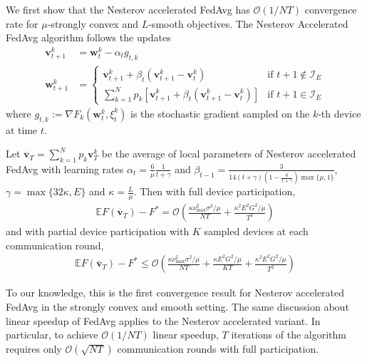 We first show that the Nesterov accelerated FedAvg has $\mathcal{O}(1/NT)$
convergence rate for $\mu$-strongly convex and $L$-smooth objectives.
The Nesterov Accelerated FedAvg algorithm follows the updates
\begin{align*}
\mathbf{v}_{t+1}^{k} & =\mathbf{w}_{t}^{k}-\alpha_{t}g_{t,k}\\
\mathbf{w}_{t+1}^{k} & =\begin{cases}
\mathbf{v}_{t+1}^{k}+\beta_{t}(\mathbf{v}_{t+1}^{k}-\mathbf{v}_{t}^{k}) & \text{if }t+1\notin\mathcal{I}_{E}\\
\sum_{k=1}^{N}p_{k}\left[\mathbf{v}_{t+1}^{k}+\beta_{t}(\mathbf{v}_{t+1}^{k}-\mathbf{v}_{t}^{k})\right] & \text{if }t+1\in\mathcal{I}_{E}
\end{cases}
\end{align*}
where $g_{t,k}:=\nabla F_{k}(\mathbf{w}_{t}^{k},\xi_{t}^{k})$ is
the stochastic gradient sampled on the $k$-th device at time $t$.  
\begin{theorem}
	\label{thm:nesterov_scvx}Let $\overline{\mathbf{v}}_{T}=\sum_{k=1}^{N}p_{k}\mathbf{v}_{T}^{k}$
	be the average of local parameters of Nesterov accelerated FedAvg
	with learning rates $\alpha_{t}=\frac{6}{\mu}\frac{1}{t+\gamma}$
	and $\beta_{t-1}=\frac{3}{14(t+\gamma)(1-\frac{6}{t+\gamma})\max\{\mu,1\}}$,
	$\gamma=\max\{32\kappa,E\}$ and $\kappa=\frac{L}{\mu}$. Then with
	full device participation, 
	\begin{align*}
	\mathbb{E}F(\overline{\mathbf{v}}_{T})-F^{\ast}=\mathcal{O}(\frac{\kappa\nu_{\max}^{2}\sigma^{2}/\mu}{NT}+\frac{\kappa^{2}E^{2}G^{2}/\mu}{T^{2}})
	\end{align*}
	and with partial device participation with $K$ sampled devices at
	each communication round, 
	\begin{align*}
	\mathbb{E}F(\overline{\mathbf{v}}_{T})-F^{\ast}\leq\mathcal{O}(\frac{\kappa\nu_{\max}^{2}\sigma^{2}/\mu}{NT}+\frac{\kappa E^{2}G^{2}/\mu}{KT}+\frac{\kappa^{2}E^{2}G^{2}/\mu}{T^{2}})
	\end{align*}
\end{theorem}
%
\begin{remark}
To our knowledge, this is the first convergence result for Nesterov
accelerated FedAvg in the strongly convex and smooth setting. The
same discussion about linear speedup of FedAvg applies to the Nesterov
accelerated variant. In particular, to achieve $\mathcal{O}(1/NT)$
linear speedup, $T$ iterations of the algorithm requires only $\mathcal{O}(\sqrt{NT})$
communication rounds with full participation. 
\end{remark}

